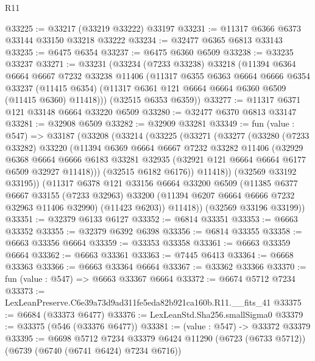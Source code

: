 \begin{lexlean}{R11}
\begin{coremodule}
@33225 := @33217 (@33219 @33222) @33197
@33231 := @11317 @6366 @6373 @33144 @33150 @33218 @33222
@33234 := @32477 @6365 @6813 @33143
@33235 := @6475 @6354
@33237 := @6475 @6360 @6509
@33238 := @33235 @33237
@33271 := @33231
    (@33234
      (@7233 @33238)
      @33218
      (@11394
        @6364
        @6664
        @6667
        @7232
        @33238
        @11406
        (@11317
          @6355
          @6363
          @6664
          @6666
          @6354
          @33237
          (@11415 @6354)
          (@11317 @6361 @121 @6664 @6664 @6360 @6509 (@11415 @6360) @11418)))
      (@32515 @6353 @6359))
@33277 := @11317 @6371 @121 @33148 @6664 @33220 @6509
@33280 := @32477 @6370 @6813 @33147
@33281 := @32908 @6509
@33282 := @32909 @33281
@33349 := fun (value : @547) =>
  @33187
    (@33208
      (@33214
        (@33225
          (@33271
            (@33277
              (@33280
                (@7233 @33282)
                @33220
                (@11394
                  @6369
                  @6664
                  @6667
                  @7232
                  @33282
                  @11406
                  (@32929
                    @6368
                    @6664
                    @6666
                    @6183
                    @33281
                    @32935
                    (@32921 @121 @6664 @6664 @6177 @6509 @32927 @11418)))
                (@32515 @6182 @6176))
              @11418))
          (@32569 @33192 @33195))
        (@11317
          @6378
          @121
          @33156
          @6664
          @33200
          @6509
          (@11385
            @6377
            @6667
            @33155
            (@7233 @32963)
            @33200
            (@11394 @6207 @6664 @6666 @7232 @32963 @11406 @32990)
            (@11423 @6203))
          @11418))
      (@32569 @33196 @33199))
@33351 := @32379 @6133 @6127
@33352 := @6814 @33351
@33353 := @6663 @33352
@33355 := @32379 @6392 @6398
@33356 := @6814 @33355
@33358 := @6663 @33356 @6664
@33359 := @33353 @33358
@33361 := @6663 @33359 @6664
@33362 := @6663 @33361
@33363 := @7445 @6413
@33364 := @6668 @33363
@33366 := @6663 @33364 @6664
@33367 := @33362 @33366
@33370 := fun (value : @547) => @6663 @33367 @6664
@33372 := @6674 @5712 @7234
@33373 := LexLeanPreserve.C6e39a73d9ad311fe5eda82b921ca160b.R11.__fits_41
@33375 := @6684 (@33373 @6477)
@33376 := LexLeanStd.Sha256.smallSigma0
@33379 := @33375 (@546 (@33376 @6477))
@33381 := (value : @547) -> @33372 @33379
@33395 := @6698
    @5712
    @7234
    @33379
    @6424
    @11290
    (@6723 (@6733 @5712))
    (@6739 (@6740 (@6741 @6424) @7234 @6716))

\end{coremodule}
\end{lexlean}
